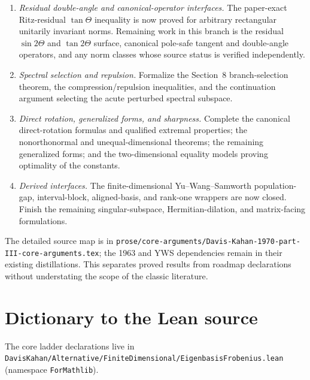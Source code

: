 \documentclass[11pt]{article}
\theoremstyle{remark}
\begin{document}
\begin{enumerate}
  $\pi/2+\varepsilon$, then establish a singular-value-preserving real descent.
  The complex matrix-unit phase realization, finite orbit certificate, Ky Fan
  transport, Fan dominance, and the $\varepsilon\downarrow0$ sharp-limit step
  are already proved.  Only after both field cases are connected should the
  generic harmonic root be replaced.  The sharp ordered and interval/exterior
  constant-one estimates remain complete and independent.
\item \emph{Residual double-angle and canonical-operator interfaces.}
  The paper-exact Ritz-residual $\tan\Theta$ inequality is now proved for
  arbitrary rectangular unitarily invariant norms.  Remaining work in this
  branch is the residual $\sin2\Theta$ and $\tan2\Theta$ surface, canonical
  pole-safe tangent and double-angle operators, and any norm classes whose
  source status is verified independently.
\item \emph{Spectral selection and repulsion.}
  Formalize the Section~8 branch-selection theorem, the compression/repulsion
  inequalities, and the continuation argument selecting the acute perturbed
  spectral subspace.
\item \emph{Direct rotation, generalized forms, and sharpness.}
  Complete the canonical direct-rotation formulas and qualified extremal
  properties; the nonorthonormal and unequal-dimensional theorems; the
  remaining generalized forms; and the two-dimensional equality models
  proving optimality of the constants.
\item \emph{Derived interfaces.}
  The finite-dimensional Yu--Wang--Samworth population-gap, interval-block,
  aligned-basis, and rank-one wrappers are now closed.  Finish the remaining
  singular-subspace, Hermitian-dilation, and matrix-facing formulations.
\end{enumerate}

The detailed source map is in
\texttt{prose/core-arguments/Davis-Kahan-1970-part-III-core-arguments.tex}; the
1963 and YWS dependencies remain in their existing distillations.  This
separates proved results from roadmap declarations without understating the
scope of the classic literature.

\section{Dictionary to the Lean source}\label{sec:dictionary}

The core ladder declarations live in
\texttt{DavisKahan/Alternative/FiniteDimensional/EigenbasisFrobenius.lean}
(namespace \texttt{ForMathlib}).
\end{document}

